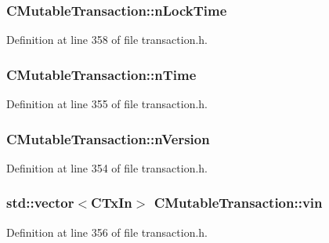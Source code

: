 \subsubsection[{n\+Lock\+Time}]{ C\+Mutable\+Transaction\+::n\+Lock\+Time}\label{struct_c_mutable_transaction_ae9685a37d424cd00e3badda28260c848}


Definition at line 358 of file transaction.\+h.

\hypertarget{struct_c_mutable_transaction_a7638f0f1222fac9b3a258cd4bf7bc13e}{}
\subsubsection[{n\+Time}]{ C\+Mutable\+Transaction\+::n\+Time}\label{struct_c_mutable_transaction_a7638f0f1222fac9b3a258cd4bf7bc13e}


Definition at line 355 of file transaction.\+h.

\hypertarget{struct_c_mutable_transaction_a23d7f377dce887f5b37539b0bf51733e}{}
\subsubsection[{n\+Version}]{ C\+Mutable\+Transaction\+::n\+Version}\label{struct_c_mutable_transaction_a23d7f377dce887f5b37539b0bf51733e}


Definition at line 354 of file transaction.\+h.

\hypertarget{struct_c_mutable_transaction_ad6b1a0a773293fd153a1d384923631da}{}
\subsubsection[{vin}]{\setlength{\rightskip}{0pt plus 5cm}std\+::vector$<${\bf C\+Tx\+In}$>$ C\+Mutable\+Transaction\+::vin}\label{struct_c_mutable_transaction_ad6b1a0a773293fd153a1d384923631da}


Definition at line 356 of file transaction.\+h.


